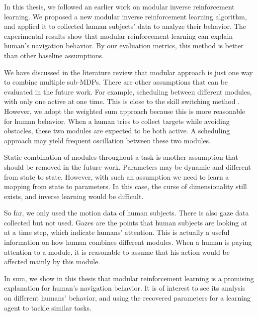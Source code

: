 In this thesis, we followed an earlier work on modular inverse reinforcement
learning. We proposed a new modular inverse reinforcement
learning algorithm, and applied it to collected human subjects' data to analyze
their behavior.
The experimental results show that modular reinforcement learning can explain
human's navigation behavior. By our evaluation metrics, this method is better than other
baseline assumptions.

We have discussed in the literature review that modular approach is just one way to combine multiple
sub-MDPs. There are other assumptions that can be evaluated in the future work.
For example, scheduling between
different modules, with only one active at one time. This is close to the skill
switching method \cite{konidaris2009skill}. However, we adopt the
weighted sum approach because this is more reasonable for human behavior. When a
human tries to collect targets while avoiding obstacles, these two modules are
expected to be both active. A scheduling approach may yield frequent oscillation
between these two modules.

Static combination of modules throughout a task is another assumption that
should be removed in the future work. Parameters may be dynamic and different from
state to state.  However, with such an assumption we need to learn a mapping
from state to parameters. In this case, the curse of dimensionality still exists,
and inverse learning would be difficult.

So far, we only used the motion data of human subjects. There is also gaze data
collected but not used. Gazes are the points that human subjects are looking at
at a time step, which indicate humans' attention. This is actually a useful
information on how human combines different modules. When a human is paying
attention to a module, it is reasonable to assume that his action would be
affected mainly by this module.

In sum, we show in this thesis that modular reinforcement learning is a
promising explanation for human's navigation behavior. It is of interest to see
its analysis on different humans' behavior, and using the recovered parameters
for a learning agent to tackle similar tasks.
